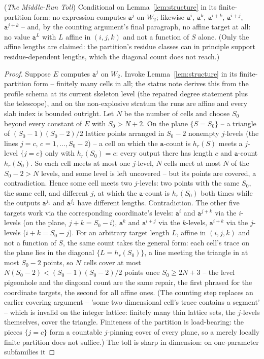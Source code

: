 \documentclass[runningheads,envcountsect]{llncs}
\begin{document}
\begin{proposition}
    (\emph{The Middle-Run Toll})
    \label{prop:toll}
    Conditional on Lemma~\ref{lem:structure} in its finite-partition form: no expression computes $\mathtt a^{j}$ on $W_2$; likewise $\mathtt a^i$, $\mathtt a^k$, $\mathtt a^{i+k}$, $\mathtt a^{i+j}$, $\mathtt a^{j+k}$ -- and, by the counting argument's final paragraph, no affine target at all: no value $\mathtt a^{L}$ with $L$ affine in $(i,j,k)$ and not a function of $S$ alone. (Only the affine lengths are claimed: the partition's residue classes can in principle support residue-dependent lengths, which the diagonal count does not reach.)
\end{proposition}

\begin{proof}
    Suppose $E$ computes $\mathtt a^j$ on $W_2$. Invoke Lemma~\ref{lem:structure} in its finite-partition form -- finitely many cells in all; the status note derives this from the profile schema at its current skeleton level (the repaired degree statement plus the telescope), and on the non-explosive stratum the runs are affine and every slab index is bounded outright. Let $N$ be the number of cells and choose $S_0$ beyond every constant of $E$ with $S_0 > N + 2$. On the plane $\{S = S_0\}$ -- a triangle of $(S_0 - 1)(S_0 - 2)/2$ lattice points arranged in $S_0 - 2$ nonempty $j$-levels (the lines $j = c$, $c = 1, \dots, S_0 - 2$) -- a cell on which the $\mathtt a$-count is $h_r(S)$ meets a $j$-level $\{j = c\}$ only with $h_r(S_0) = c$: every output there has length $c$ and $\mathtt a$-count $h_r(S_0)$. So each cell meets at most one $j$-level, $N$ cells meet at most $N$ of the $S_0 - 2 > N$ levels, and some level is left uncovered -- but its points are covered, a contradiction. Hence some cell meets two $j$-levels: two points with the same $S_0$, the same cell, and different $j$, at which the $\mathtt a$-count is $h_r(S_0)$ both times while the outputs $\mathtt a^{j_1}$ and $\mathtt a^{j_2}$ have different lengths. Contradiction. The other five targets work via the corresponding coordinate's levels: $\mathtt a^i$ and $\mathtt a^{j+k}$ via the $i$-levels (on the plane, $j + k = S_0 - i$), $\mathtt a^k$ and $\mathtt a^{i+j}$ via the $k$-levels, $\mathtt a^{i+k}$ via the $j$-levels ($i + k = S_0 - j$). For an arbitrary target length $L$, affine in $(i,j,k)$ and not a function of $S$, the same count takes the general form: each cell's trace on the plane lies in the diagonal $\{L = h_r(S_0)\}$, a line meeting the triangle in at most $S_0 - 2$ points, so $N$ cells cover at most $N(S_0 - 2) < (S_0 - 1)(S_0 - 2)/2$ points once $S_0 \geq 2N + 3$ -- the level pigeonhole and the diagonal count are the same repair, the first phrased for the coordinate targets, the second for all affine ones. (The counting step replaces an earlier covering argument -- 'some two-dimensional cell's trace contains a segment' -- which is invalid on the integer lattice: finitely many thin lattice sets, the $j$-levels themselves, cover the triangle. Finiteness of the partition is load-bearing: the pieces $\{j = c\}$ form a countable $j$-pinning cover of every plane, so a merely locally finite partition does not suffice.) The toll is sharp in dimension: on one-parameter subfamilies it 
\end{proof}
\end{document}
